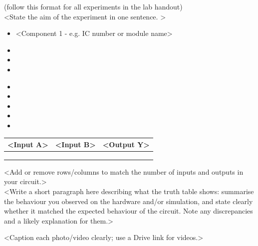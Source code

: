 \documentclass{labreport}
\begin{document}
\makeheader


\begin{labaim}
    (follow this format for all experiments in the lab handout) \\
    <State the aim of the experiment in one sentence. >
\end{labaim}

\begin{labcomponents}
    \begin{itemize}
        \item <Component 1 - e.g. IC number or module name>
        \item <Component 2>
        \item <Component 3>
        \item <Component 4>
    \end{itemize}
\end{labcomponents}

\begin{labprocedure}
    \begin{itemize}
        \item <Step 1>
        \item <Step 2>
        \item <Step 3>
        \item <Step 4>
        \item <Step 5>
    \end{itemize}
\end{labprocedure}

\begin{labobservation}
    \begin{table}[h]
        \centering
        \begin{tabular}{|c|c|c|}
            \hline
            \textbf{<Input A>} & \textbf{<Input B>} & \textbf{<Output Y>} \\
            \hline
             & & \\
             & & \\
             & & \\
            \hline
        \end{tabular}
    \end{table}

    \noindent <Add or remove rows/columns to match the number of inputs and outputs in your circuit.> \\[1em]
    <Write a short paragraph here describing what the truth table shows: summarise the behaviour you observed on the hardware and/or simulation, and state clearly whether it matched the expected behaviour of the circuit. Note any discrepancies and a likely explanation for them.>
\end{labobservation}


\begin{labpics}
    <Caption each photo/video clearly; use a Drive link for videos.>
\end{labpics}
\end{document}
